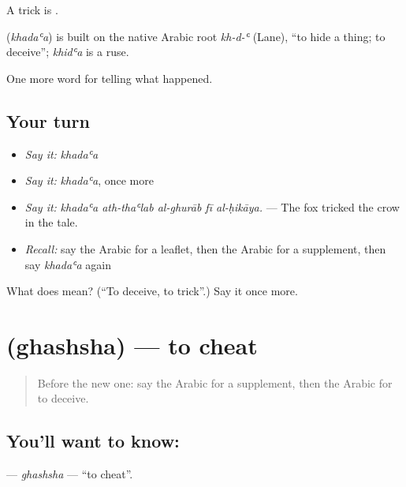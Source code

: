 A trick is .

\begin{cousinweb}
\textbf{} (\emph{khadaʿa}) is built on the native Arabic root \emph{kh-d-ʿ} (Lane), \textquotedblleft{}to hide a thing; to deceive\textquotedblright{}; \emph{khidʿa} is a ruse.
\end{cousinweb}

\begin{grammarlens}[title={What you've built}]
One more word for telling what happened.
\end{grammarlens}

\subsection*{Your turn}
\begin{itemize}
\raggedright
  \item \emph{Say it:} \emph{khadaʿa}
  \item \emph{Say it:} \emph{khadaʿa}, once more
  \item \emph{Say it:} \emph{khadaʿa ath-thaʿlab al-ghurāb fī al-ḥikāya.} — The fox tricked the crow in the tale.
  \item \emph{Recall:} say the Arabic for a leaflet, then the Arabic for a supplement, then say \emph{khadaʿa} again
\end{itemize}

\begin{tcolorbox}[breakable,colback=teal!4,colframe=teal!35!black,title={Before you move on}]
What does  mean? (\textquotedblleft{}To deceive, to trick\textquotedblright{}.) Say it once more.
\end{tcolorbox}
\section[\texorpdfstring{\ar{غش} (ghashsha)}{غش (ghashsha)}]{ (ghashsha) — to cheat}

\label{lesson:AR-C351-ghashsha}



\begin{quote}
Before the new one: say the Arabic for a supplement, then the Arabic for to deceive.
\end{quote}

\subsection*{You'll want to know: }
\textbf{} — \emph{ghashsha} — \textquotedblleft{}to cheat\textquotedblright{}.

